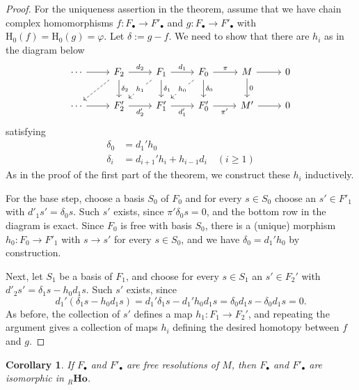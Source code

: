 \documentclass[11pt]{amsbook}
\def\rH{{\mathrm H}} \def\rK{{\mathrm K}} \def\rR{{\mathrm R}}
\def\Ho{\mathbf{Ho}}
\theoremstyle{plain}
\newtheorem{corollary}[theorem]{Corollary}
\theoremstyle{definition}
\begin{document}
\begin{proof}
 For the uniqueness assertion in the theorem, assume that we have chain complex homomorphisms $f\colon F_\bullet \to F'_\bullet$ and $g\colon F_\bullet \to F'_\bullet$ with $\rH_0(f)=\rH_0(g)=\varphi$. Let $\delta := g-f$. We need to show that there are $h_i$ as in the diagram below
 \[
\begin{tikzcd}
\cdots \arrow{r} & F_2 \arrow{r}{d_2} \arrow{d}{\delta_2} \arrow[dashed]{dl}
	& F_1 \arrow{d}{\delta_1} \arrow{r}{d_1} \arrow[dashed]{dl}[description]{h_1}
	& F_0 \arrow{d}{\delta_0} \arrow{r}{\pi} \arrow[dashed]{dl}[description]{h_0}
	& M \arrow{d}{0} \arrow{r} & 0 \\
\cdots \arrow{r} & F_2' \arrow[swap]{r}{d'_2} 
	& F_1'  \arrow[swap]{r}{d'_1} 
	& F_0' \arrow[swap]{r}{\pi'} 
	& M'  \arrow{r} & 0 
\end{tikzcd}
\]
 satisfying
\begin{align*}
	\delta_0 &= d_1'h_0 \\
	\delta_i &= d_{i+1}'h_i + h_{i-1} d_i \quad (i\geq 1)
\end{align*}
As in the proof of the first part of the theorem, we construct these $h_i$ inductively. 

For the base step,  choose a basis $S_0$ of $F_0$ and for every $s\in S_0$ choose an $s' \in F'_1$ with $d'_1 s' = \delta_0 s$. Such $s'$ exists, since $\pi'\delta_0 s=0$, and the bottom row in the diagram is exact. Since $F_0$ is free with basis $S_0$, there is a (unique) morphism $h_0\colon F_0\to F'_1$ with $s\to s'$ for every $s\in S_0$, and we have $\delta_0 = d_1'h_0$ by  construction.

Next, let $S_1$ be a basis of $F_1$, and choose for every $s\in S_1$ an $s'\in F_2'$ with $d'_2s' = \delta_1s - h_0d_1s$. Such $s'$ exists, since
\[
	d_1'(\delta_1s - h_0d_1s) = d_1'\delta_1 s - d_1'h_0d_1s
	= \delta_0 d_1 s - \delta_0 d_1 s = 0.
\]
As before, the collection of $s'$ defines a map $h_1\colon F_1 \to F_2'$, and repeating the argument gives a collection of maps $h_i$ defining the desired homotopy between $f$ and $g$.
\end{proof}

\begin{corollary}
If $F_\bullet$ and $F'_\bullet$ are free resolutions of $M$, then $F_\bullet$ and $F'_\bullet$ are isomorphic in ${}_R\Ho$.
\end{corollary}
\end{document}
